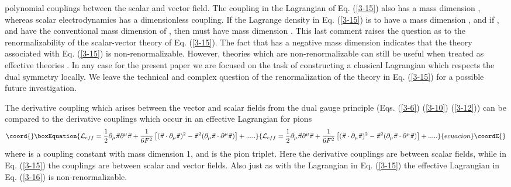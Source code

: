 \documentclass[a4paper,aps]{revtex4}
\begin{document}
polynomial couplings between the scalar and vector field. The
coupling \coordHE{} in the Lagrangian of Eq. (\ref{3-15}) also has
a mass dimension \coordHE{}, whereas
scalar electrodynamics has a dimensionless
coupling. If the Lagrange density in Eq. (\ref{3-15}) is to have
a mass dimension \coordHE{}, and if \myHighlight{$\phi$}\coordHE{}, \coordHE{} and \myHighlight{$\partial_{\mu}$}\coordHE{}
have the conventional mass dimension of \coordHE{}, then \coordHE{} must have
mass dimension \coordHE{}. This last comment raises the question
as to the renormalizability of the scalar-vector theory of
Eq. (\ref{3-15}). The fact that \coordHE{} has a negative mass dimension
indicates that the theory associated with Eq. (\ref{3-15}) is
non-renormalizable. However, theories which are non-renormalizable
can still be useful when treated as effective theories
\cite{wein}. In any case for the present paper we are focused
on the task of constructing a classical Lagrangian which
respects the dual symmetry locally. We leave the technical
and complex question of the renormalization of the theory
in Eq. (\ref{3-15}) for a possible future investigation.

The derivative coupling which arises between the vector and scalar
fields from the dual gauge principle (Eqs. (\ref{3-6})
(\ref{3-10}) (\ref{3-12})) can be compared to the derivative
couplings which occur in an effective Lagrangian for pions \cite{don}
\begin{equation}\coord{}\boxEquation{
\label{3-16}
{\cal L}_{eff} = \frac{1}{2} \partial _{\mu} {\vec \pi}
\partial^{\mu} {\vec \pi} + \frac{1}{6F^2}\left[ ({\vec \pi}\cdot
\partial _{\mu} {\vec \pi})^2 - {\vec \pi}^2 (\partial _{\mu}
{\vec \pi} \cdot \partial ^{\mu} {\vec \pi}) \right] +.....
}{
{\cal L}_{eff} = \frac{1}{2} \partial _{\mu} {\vec \pi}
\partial^{\mu} {\vec \pi} + \frac{1}{6F^2}\left[ ({\vec \pi}\cdot
\partial _{\mu} {\vec \pi})^2 - {\vec \pi}^2 (\partial _{\mu}
{\vec \pi} \cdot \partial ^{\mu} {\vec \pi}) \right] +.....
}{ecuacion}\coordE{}\end{equation}
where \coordHE{} is a coupling constant with mass dimension 1, and
\myHighlight{${\vec \pi}$}\coordHE{} is the pion triplet. Here the derivative couplings are
between scalar fields, while in Eq. (\ref{3-15}) the couplings are between
scalar and vector fields. Also just as with the Lagrangian
in Eq. (\ref{3-15}) the effective Lagrangian in Eq. (\ref{3-16}) is
non-renormalizable.
\end{document}
